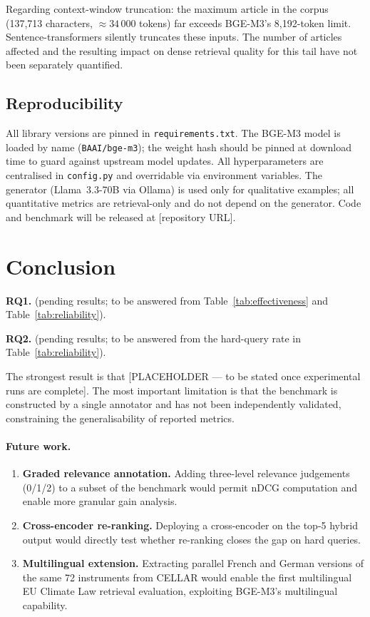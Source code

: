 \documentclass{iosart2x}
\newcommand{\PH}{\text{[PLACEHOLDER]}\xspace}
\newcommand{\bgem}{BGE-M3\xspace}
\begin{document}
Regarding context-window truncation: the maximum article in the corpus
(137,713 characters, ${\approx}34\,000$ tokens) far exceeds \bgem's
8,192-token limit.  Sentence-transformers silently truncates these
inputs.  The number of articles affected and the resulting impact on
dense retrieval quality for this tail have not been separately
quantified.

\subsection{Reproducibility}
\label{sec:validity-reproducibility}

All library versions are pinned in \texttt{requirements.txt}.  The
\bgem model is loaded by name (\texttt{BAAI/bge-m3}); the weight hash
should be pinned at download time to guard against upstream model
updates.  All hyperparameters are centralised in \texttt{config.py}
and overridable via environment variables.  The generator (Llama~3.3-70B
via Ollama) is used only for qualitative examples; all quantitative
metrics are retrieval-only and do not depend on the generator.  Code
and benchmark will be released at [repository URL].

\section{Conclusion}
\label{sec:conclusion}

\textbf{RQ1.}  \PH{} (pending results; to be answered from
Table~\ref{tab:effectiveness} and Table~\ref{tab:reliability}).

\textbf{RQ2.}  \PH{} (pending results; to be answered from the
hard-query rate in Table~\ref{tab:reliability}).

The strongest result is that [PLACEHOLDER --- to be stated once
experimental runs are complete].  The most important limitation is
that the benchmark is constructed by a single annotator and has not
been independently validated, constraining the generalisability of
reported metrics.

\paragraph{Future work.}
\begin{enumerate}
  \item \textbf{Graded relevance annotation.}  Adding three-level
    relevance judgements (0/1/2) to a subset of the benchmark would
    permit nDCG computation and enable more granular gain analysis.
  \item \textbf{Cross-encoder re-ranking.}  Deploying a cross-encoder
    on the top-5 hybrid output would directly test whether re-ranking
    closes the gap on hard queries.
  \item \textbf{Multilingual extension.}  Extracting parallel French
    and German versions of the same 72 instruments from CELLAR would
    enable the first multilingual EU Climate Law retrieval evaluation,
    exploiting \bgem's multilingual capability.
\end{enumerate}
\end{document}
